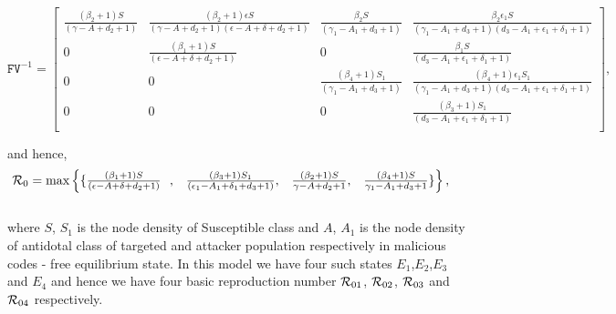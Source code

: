 \documentclass[12pt]{article}
\begin{document}
\[ \mathbf{\mathtt{FV}}^{-1} = \left[
                                           \begin{array}{cccc}
                                             \frac{(\beta _{2}+1)S}{(\gamma-A+ d_{2}+1)} &  \frac{(\beta _{2}+1)\epsilon S}
                                               {(\gamma-A+ d_{2}+1)(\epsilon-A+\delta+d_{2}+1)} &
                                               \frac{\beta _{2}S}{(\gamma_{1}-A_{1}+ d_{3}+1)} &
                                               \frac{\beta_{2}\epsilon_{1}S}{(\gamma_{1}-A_{1}+d_{3}+1)(d_{3}-A_{1}+\epsilon_{1}+\delta_{1}+1)}\\
                                               0 & \frac{(\beta_{1}+1)S}{(\epsilon-A+\delta+d_{2}+1)} & 0 &  \frac{\beta_{1}S}{(d_{3}-A_{1}+\epsilon_{1}+\delta_{1}+1)}  \\
                                               0 & 0 &  \frac{(\beta _{4}+1)S_{1}}{(\gamma_{1}-A_{1}+ d_{3}+1)} &  \frac{(\beta_{4}+1)\epsilon_{1}S_{1}}{(\gamma_{1}-A_{1}+d_{3}+1)(d_{3}-A_{1}+\epsilon_{1}+\delta_{1}+1)}\\
                                               0 & 0 & 0 &
                                               \frac{(\beta_{3}+1)S_{1}}{(d_{3}-A_{1}+\epsilon_{1}+\delta_{1}+1)}\\
                                           \end{array}
                                         \right], \]

and hence,\\

\begin{align}
& {{\cal R}}_{0} = \text{max} \begin{Bmatrix}
\{\frac{(\beta _{1}+1){S}}{(\epsilon-A+\delta+d_{2}+1 )}\ \ ,& \frac{(\beta _{3}+1)S_{1}}{ (\epsilon_{1}-A_{1}+\delta_{1}+d_{3}+1)}, &\frac{(\beta _{2}+1){S}}{\gamma-A+d_{2}+1},&\frac{(\beta _{4}+1){S}}{\gamma_{1}-A_{1}+d_{3}+1}\}
\end{Bmatrix}
,\end{align}\\

where $S$, $S_{1}$ is the node density of Susceptible class and $A$, $A_{1}$ is the node density of antidotal class of targeted and attacker population respectively in malicious codes - free equilibrium state. In this model we have four such states $E_1$,$E_2$,$E_3$ and $E_4$ and hence we have four basic reproduction number ${{\cal R}}_{01}$, ${{\cal R}}_{02}$, ${{\cal R}}_{03}$ and ${{\cal R}}_{04}$ respectively.\\
\end{document}
